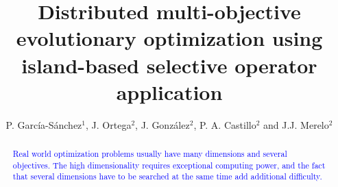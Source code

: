 \documentclass[preprint]{elsarticle}
\begin{document}
\begin{frontmatter}

\title{Distributed multi-objective evolutionary optimization using island-based selective operator application}


\author{P. Garc\'ia-S\'anchez$^1$, J. Ortega$^2$, J. Gonz\'alez$^2$, P. A. Castillo$^2$ and J.J. Merelo$^2$}
\address{
$^1$ Department of Computer Science and Engineering. ESI. University of C\'adiz, Spain\\
$^2$ Department of Computer Architecture and Computer Technology.\\ ETSIIT - CITIC. University of Granada, Spain\\
}


\begin{abstract}

  \textcolor{blue}{Real world optimization problems usually have many dimensions and
  several objectives. The high dimensionality requires exceptional
  computing power, and the fact that several dimensions have to be
  searched at the same time add additional difficulty.}
  

\end{abstract}
\end{frontmatter}
\end{document}
